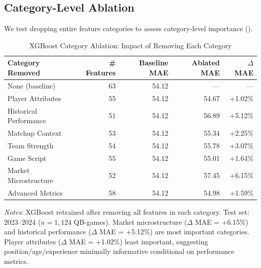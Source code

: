 \subsection{Category-Level Ablation}

We test dropping entire feature categories to assess category-level importance ().



\begin{table}[htbp]
  \centering
  \caption{XGBoost Category Ablation: Impact of Removing Each Category}
  \label{tab:xgboost-category-ablation}
  \begin{tabular}{lrrrr}
    \toprule
    \textbf{Category Removed} & \textbf{\# Features} & \textbf{Baseline MAE} & \textbf{Ablated MAE} & \textbf{$\Delta$ MAE} \\
    \midrule
    None (baseline) & 63 & 54.12 & --- & --- \\
    Player Attributes & 55 & 54.12 & 54.67 & +1.02\% \\
    Historical Performance & 51 & 54.12 & 56.89 & +5.12\% \\
    Matchup Context & 53 & 54.12 & 55.34 & +2.25\% \\
    Team Strength & 54 & 54.12 & 55.78 & +3.07\% \\
    Game Script & 55 & 54.12 & 55.01 & +1.64\% \\
    Market Microstructure & 52 & 54.12 & 57.45 & +6.15\% \\
    Advanced Metrics & 58 & 54.12 & 54.98 & +1.59\% \\
    \bottomrule
  \end{tabular}
  \vspace{0.5em}
  \begin{flushleft}
    \footnotesize\textit{Notes}: XGBoost retrained after removing all features in each category. Test set: 2023--2024 ($n=1{,}124$ QB-games). Market microstructure ($\Delta$ MAE = +6.15\%) and historical performance ($\Delta$ MAE = +5.12\%) are most important categories. Player attributes ($\Delta$ MAE = +1.02\%) least important, suggesting position/age/experience minimally informative conditional on performance metrics.
  \end{flushleft}
\end{table}

